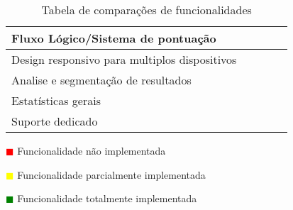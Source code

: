 \begin{table}[!ht]
\begin{center}
\begin{tabular}{|p{4cm}|p{0.1cm}|p{0.1cm}|p{0.1cm}|p{0.1cm}|}
			Fluxo Lógico/Sistema de pontuação &\cellcolor{yellow!80}  & \cellcolor{green!80} & \cellcolor{green!80} & \cellcolor{green!80}  \\ \hline
			
			Design responsivo para multiplos dispositivos & \cellcolor{green!80}  & \cellcolor{green!80} & \cellcolor{green!80} & \cellcolor{green!80}  \\ \hline
			
			Analise e segmentação de resultados & \cellcolor{green!80}  & \cellcolor{green!80}  & \cellcolor{green!80} & \cellcolor{green!80} \\ \hline
			
			Estatísticas gerais & \cellcolor{yellow!80}  & \cellcolor{red!80}  & \cellcolor{red!80} & \cellcolor{green!80} \\ \hline
			
			Suporte dedicado & \cellcolor{green!80}  & \cellcolor{green!80}  & \cellcolor{green!80} & \cellcolor{green!80} \\ \hline
			
			
			
			
		\end{tabular}
	\end{center}
	\hspace{1.2cm}	\textcolor{red}{$\blacksquare$} Funcionalidade não implementada
	
	\hspace{1.2cm}     \textcolor{yellow}{$\blacksquare$} Funcionalidade parcialmente implementada
	
	\hspace{1.2cm}     \textcolor{green}{$\blacksquare$} Funcionalidade totalmente implementada 
	\begin{center}
		\caption{Tabela de comparações de funcionalidades}
		\label{tab:comparacao2}
	\end{center}
\end{table}



\blankpage

\glsresetall



